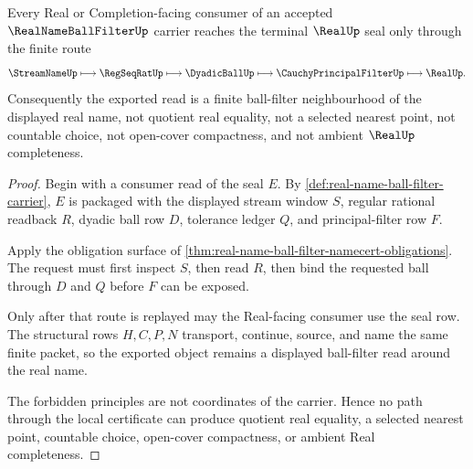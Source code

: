 \begin{theorem}
\label{thm:real-name-ball-filter-real-seal-nonescape}
Every Real or Completion-facing consumer of an accepted $\RealNameBallFilterUp$ carrier reaches the terminal $\RealUp$ seal only through the finite route
$$
\StreamNameUp \longmapsto \RegSeqRatUp \longmapsto \DyadicBallUp \longmapsto \CauchyPrincipalFilterUp \longmapsto \RealUp .
$$
Consequently the exported read is a finite ball-filter neighbourhood of the displayed real name, not quotient real equality, not a selected nearest point, not countable choice, not open-cover compactness, and not ambient $\RealUp$ completeness.
\end{theorem}
\begin{proof}
Begin with a consumer read of the seal $E$. By \autoref{def:real-name-ball-filter-carrier}, $E$ is packaged with the displayed stream window $S$, regular rational readback $R$, dyadic ball row $D$, tolerance ledger $Q$, and principal-filter row $F$.

Apply the obligation surface of \autoref{thm:real-name-ball-filter-namecert-obligations}. The request must first inspect $S$, then read $R$, then bind the requested ball through $D$ and $Q$ before $F$ can be exposed.

Only after that route is replayed may the Real-facing consumer use the seal row. The structural rows $H,C,P,N$ transport, continue, source, and name the same finite packet, so the exported object remains a displayed ball-filter read around the real name.

The forbidden principles are not coordinates of the carrier. Hence no path through the local certificate can produce quotient real equality, a selected nearest point, countable choice, open-cover compactness, or ambient Real completeness.
\end{proof}



